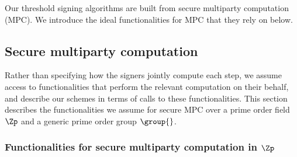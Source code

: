 Our threshold signing algorithms are built from secure multiparty computation
(MPC). We introduce the ideal functionalities for MPC that they rely on below.

\subsection{Secure multiparty computation}\label{sec:MPC}

Rather than specifying how the signers jointly compute each step, we assume
access to functionalities that perform the relevant computation on their
behalf, and describe our schemes in terms of calls to these functionalities.
This section describes the functionalities we assume for secure MPC over a
prime order field $\Zp$ and a generic prime order group $\group{}$.

\subsubsection{Functionalities for secure multiparty computation in $\Zp$}

